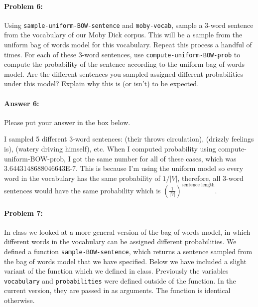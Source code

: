\documentclass[10pt]{article}
\newenvironment{AnswerBox}{\begin{mdframed}[style=simple]}{\end{mdframed}}
\begin{document}
\paragraph{Problem 6:}

Using \texttt{sample-uniform-BOW-sentence} and \texttt{moby-vocab}, sample a
3-word sentence from the vocabulary of our Moby Dick corpus. This will be a
sample from the uniform bag of words model for this vocabulary. Repeat this
process a handful of times. For each of these 3-word sentences, use
\texttt{compute-uniform-BOW-prob} to compute the probability of the sentence
according to the uniform bag of words model. Are the different sentences you
sampled assigned different probabilities under this model? Explain why this is
(or isn't) to be expected.

\paragraph{Answer 6:} Please put your answer in the box below.

\begin{AnswerBox}%

    I sampled 5 different 3-word sentences: (their throws circulation), (drizzly feelings is), (watery driving himself), etc. When I computed probability using compute-uniform-BOW-prob, I got the same number for all of these cases, which was 3.6443148688046643E-7. This is because I'm using the uniform model so every word in the vocabulary has the same probability of $1 / |V|$, therefore, all 3-word sentences would have the same probability which is $ \left( \frac{1}{|V|} \right)^{\text{sentence length}}.$


\end{AnswerBox}%

\hrulefill %

\paragraph{Problem 7:}

In class we looked at a more general version of the bag of words
model, in which different words in the vocabulary can be assigned
different probabilities. We defined a function \texttt{sample-BOW-sentence},
which returns a sentence sampled from the bag of words model that we
have specified. Below we have included a slight variant of the
function which we defined in class. Previously the variables
\texttt{vocabulary} and \texttt{probabilities} were defined outside of the function. In
the current version, they are passed in as arguments. The function is
identical otherwise.
\end{document}
